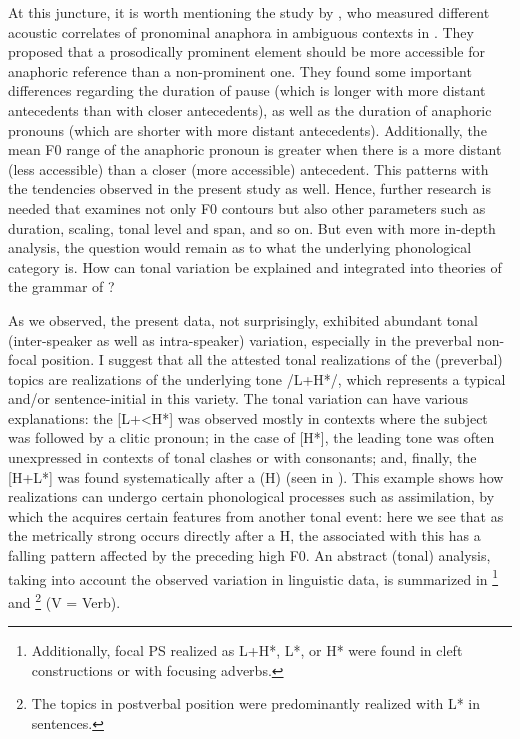 \documentclass[output=paper]{langsci/langscibook}
\begin{document}
At this juncture, it is worth mentioning the study by \citet{Rello2012}, who measured different acoustic correlates of pronominal anaphora in ambiguous contexts in . They proposed that a prosodically prominent element should be more accessible for anaphoric reference than a non-prominent one. They found some important differences regarding the duration of pause (which is longer with more distant antecedents than with closer antecedents), as well as the duration of anaphoric pronouns (which are shorter with more distant antecedents). Additionally, the mean F0 range of the anaphoric pronoun is greater when there is a more distant (less accessible) than a closer (more accessible) antecedent. This patterns with the tendencies observed in the present study as well. Hence, further research is needed that examines not only F0 contours but also other  parameters such as duration, scaling, tonal level and span, and so on. But even with more in-depth  analysis, the question would remain as to what the underlying phonological category is. How can tonal variation be explained and integrated into theories of the grammar of ? 

As we observed, the present data, not surprisingly, exhibited abundant tonal (inter-speaker as well as intra-speaker) variation, especially in the preverbal non-focal position. I suggest that all the attested tonal realizations of the (preverbal) topics are  realizations of the underlying tone /L+H*/, which represents a typical  and/or sentence-initial  in this variety. The tonal variation can have various explanations: the  [L+<H*] was observed mostly in contexts where the subject was followed by a clitic pronoun; in the case of [H*], the leading tone was often unexpressed in contexts of tonal clashes or with  consonants; and, finally, the [H+L*] was found systematically after a  (H\textminus{}) (seen in ). This example shows how  realizations can undergo certain phonological processes such as assimilation, by which the  acquires certain features from another tonal event: here we see that as the metrically strong  occurs directly after a H\textminus{}, the  associated with this  has a falling pattern affected by the preceding high F0. An abstract (tonal) analysis, taking into account the observed variation in linguistic data, is summarized in \footnote{Additionally, focal PS realized as L+H*, L*, or H* were found in cleft constructions or with focusing adverbs.} and \footnote{The topics in postverbal position were predominantly realized with L* in  sentences.} (V = Verb).\largerpage
\end{document}
